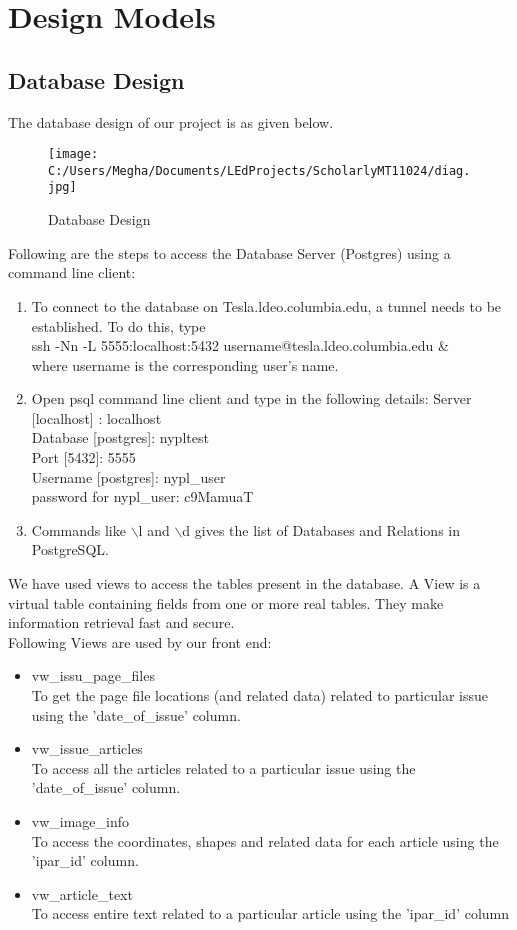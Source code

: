 \documentclass[amsart, 12pt]{article}
\begin{document}
\section{Design Models}
\subsection{Database Design}

The database design of our project is as given below.\\
\begin{figure}[ht!]
\centering
\texttt{[image: C:/Users/Megha/Documents/LEdProjects/ScholarlyMT11024/diag.jpg]}
\caption{Database Design}
\label{fig:Phase 2}
\end{figure}

Following are the steps to access the Database Server (Postgres) using a command line client:
\begin{enumerate}
\item To connect to the database on Tesla.ldeo.columbia.edu, a tunnel needs to be established. To do this, type \\
ssh -Nn -L 5555:localhost:5432 username@tesla.ldeo.columbia.edu \& \\
where username is the corresponding user's name.
\item Open psql command line client and type in the following details:
Server [localhost] : localhost \\
Database [postgres]: nypltest \\
Port [5432]: 5555 \\
Username [postgres]: nypl\_user \\
password for nypl\_user: c9MamuaT \\
\item Commands like $\backslash$l and $\backslash$d gives the list of Databases and Relations in PostgreSQL.
\end{enumerate}
We have used views to access the tables present in the database. A View is a virtual table containing fields from one or more real tables. They make information retrieval fast and secure.\\
Following Views are used by our front end:
\begin{itemize}
\item vw\_issu\_page\_files \\
To get the page file locations (and related data) related to particular issue using the 'date\_of\_issue' column.

\item vw\_issue\_articles \\
To access all the articles related to a particular issue using the 'date\_of\_issue' column.

\item vw\_image\_info \\
To access the coordinates, shapes and related data for each article using the 'ipar\_id' column.

\item vw\_article\_text \\
To access entire text related to a particular article using the 'ipar\_id' column
\end{itemize}
\end{document}
